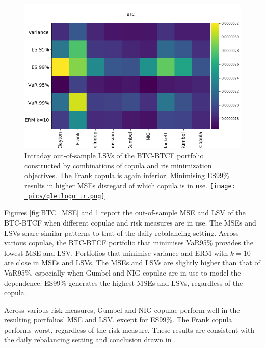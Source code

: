 \documentclass[11pt,a4paper,english]{article}
\providecommand{\natp}[1]{\textcolor{darkorange}{#1}}
\begin{document}
\begin{figure}[t]
  \begin{center}
    \includegraphics[width=.65\textwidth]{_pics/revision_BTC_LSVs.png}
  \end{center}
  \caption{Intraday out-of-sample LSVs of the BTC-BTCF portfolio constructed by combinations of copula and ris minimization objectives.
    The Frank copula is again inferior. Minimising ES99\% results in higher MSEs disregard of which copula is in use.
  \href{http://www.quantlet.com/}{\texttt{[image: \_pics/qletlogo\_tr.png]}} }
\label{fig:BTC_LSV}
\end{figure}

Figures \ref{fig:BTC_MSE} and \ref{fig:BTC_LSV} report the
out-of-sample MSE and LSV of the BTC-BTCF when different copulae and
risk measures are in use. The MSEs and LSVs share similar patterns to that of the daily rebalancing
setting. 
Across various copulae, the BTC-BTCF portfolio that minimises VaR95\%
provides the lowest MSE and LSV. 
Portfolios that minimise variance and ERM with $k=10$ are close in MSEs and LSVs,
The MSEs and LSVs are slightly higher than that of VaR95\%, especially when Gumbel and NIG copulae
are in use to model the dependence. ES99\% generates the highest MSEs
and LSVs, regardless of the copula. 

Across various risk measures, Gumbel and NIG copulae perform
well in the resulting portfolios’ MSE and LSV, except for
ES99\%. 
The Frank copula performs worst, regardless of the risk measure. 
These results are consistent with the daily rebalancing setting and
conclusion drawn in \citet[p.667]{barbi2014copula}. 
\end{document}
